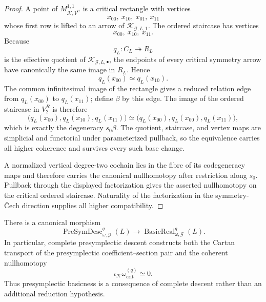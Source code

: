 \begin{proof}
A point of $M_{\mathcal K,V^C}^{1,1}$ is a critical rectangle with vertices
\[
x_{00},\ x_{10},\ x_{01},\ x_{11}
\]
whose first row is lifted to an arrow of
$\mathcal K_{\mathcal G,L,1}$.  The ordered staircase has vertices
\[
x_{00},\ x_{10},\ x_{11}.
\]
Because
\[
q_L:C_L\twoheadrightarrow R_L
\]
is the effective quotient of $\mathcal K_{\mathcal G,L,\bullet}$, the endpoints of
every critical symmetry arrow have canonically the same image in $R_L$.  Hence
\[
q_L(x_{00})\simeq q_L(x_{10}).
\]
The common infinitesimal image of the rectangle gives a reduced relation edge from
$q_L(x_{00})$ to $q_L(x_{11})$; define $\beta$ by this edge.  The image of the
ordered staircase in $V^R_2$ is therefore
\[
\bigl(q_L(x_{00}),q_L(x_{10}),q_L(x_{11})\bigr)
\simeq
\bigl(q_L(x_{00}),q_L(x_{00}),q_L(x_{11})\bigr),
\]
which is exactly the degeneracy $s_0\beta$.  The quotient, staircase, and vertex
maps are simplicial and functorial under parameterized pullback, so the equivalence
carries all higher coherence and survives every such base change.

A normalized vertical degree-two cochain lies in the fibre of its codegeneracy
maps and therefore carries the canonical nullhomotopy after restriction along
$s_0$.  Pullback through the displayed factorization gives the asserted
nullhomotopy on the critical ordered staircase.  Naturality of the factorization in
the symmetry-\v{C}ech direction supplies all higher compatibility.
\end{proof}

\begin{theorem}
\label{thm:symmetry-noether-complete-presymplectic-descent-implies-cartan-basicness}
There is a canonical morphism
\[
\boxed{
\operatorname{PreSymDesc}_{\omega,\mathcal G}^{q}(L)
\longrightarrow
\operatorname{BasicReal}_{\omega,\mathcal G}^{q}(L).
}
\]
In particular, complete presymplectic descent constructs both the Cartan transport
of the presymplectic coefficient--section pair and the coherent nullhomotopy
\[
\boxed{
\iota_{\mathcal K}\omega_{\mathrm{crit}}^{(q)}\simeq0.
}
\]
Thus presymplectic basicness is a consequence of complete descent rather than an
additional reduction hypothesis.
\end{theorem}

